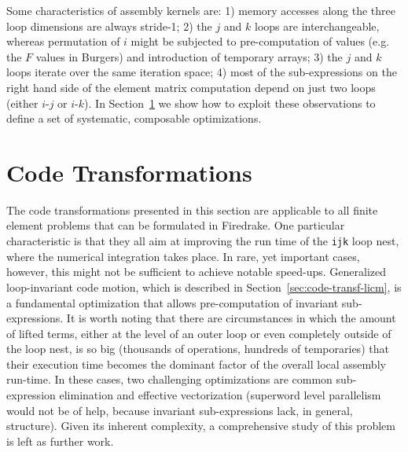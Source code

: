 \documentclass[conference]{IEEEtran}
\begin{document}
Some characteristics of assembly kernels are: 1) memory accesses along the three loop dimensions are always stride-1; 2) the $j$ and $k$ loops are interchangeable, whereas permutation of $i$ might be subjected to pre-computation of values (e.g. the $F$ values in Burgers) and introduction of temporary arrays; 3) the $j$ and $k$ loops iterate over the same iteration space; 4) most of the sub-expressions on the right hand side of the element matrix computation depend on just two loops (either $i$-$j$ or $i$-$k$). In Section~\ref{sec:code-transf} we show how to exploit these observations to define a set of systematic, composable optimizations.


\section{Code Transformations}
\label{sec:code-transf}
The code transformations presented in this section are applicable to all finite element problems that can be formulated in Firedrake. One particular characteristic is that they all aim at improving the run time of the \texttt{ijk} loop nest, where the numerical integration takes place. In rare, yet important cases, however, this might not be sufficient to achieve notable speed-ups. Generalized loop-invariant code motion, which is described in Section~\ref{sec:code-transf-licm}, is a fundamental optimization that allows pre-computation of invariant sub-expressions. It is worth noting that there are circumstances in which the amount of lifted terms, either at the level of an outer loop or even completely outside of the loop nest, is so big (thousands of operations, hundreds of temporaries) that their execution time becomes the dominant factor of the overall local assembly run-time. In these cases, two challenging optimizations are common sub-expression elimination and effective vectorization (superword level parallelism~\cite{SLP} would not be of help, because invariant sub-expressions lack, in general, structure). Given its inherent complexity, a comprehensive study of this problem is left as further work.
\end{document}
